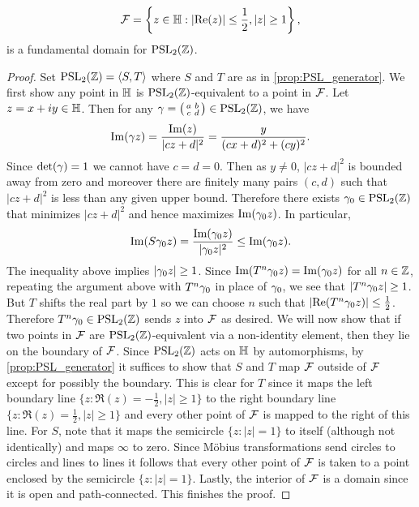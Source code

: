       \begin{proposition}\label{prop:fundamental_domain_modular_group}
        \[
          \mathcal{F} = \left\{z \in \mathbb{H}:|\mathrm{Re}(z)| \le \frac{1}{2}, |z| \ge 1\right\},
        \]
        is a fundamental domain for $\mathrm{PSL}_{2}(\mathbb{Z})$.
      \end{proposition}
      \begin{proof}
        Set $\mathrm{PSL}_{2}(\mathbb{Z}) = \langle S,T\rangle$ where $S$ and $T$ are as in \cref{prop:PSL_generator}. We first show any point in $\mathbb{H}$ is $\mathrm{PSL}_{2}(\mathbb{Z})$-equivalent to a point in $\mathcal{F}$. Let $z = x+iy \in \mathbb{H}$. Then for any $\gamma = \begin{psmallmatrix} a & b \\ c & d \end{psmallmatrix} \in \mathrm{PSL}_{2}(\mathbb{Z})$, we have
        \[
          \mathrm{Im}(\gamma z) = \frac{\mathrm{Im}(z)}{|cz+d|^{2}} = \frac{y}{(cx+d)^{2}+(cy)^{2}}.
        \]
        Since $\det(\gamma) = 1$ we cannot have $c = d = 0$. Then as $y \neq 0$, $|cz+d|^{2}$ is bounded away from zero and moreover there are finitely many pairs $(c,d)$ such that $|cz+d|^{2}$ is less than any given upper bound. Therefore there exists $\gamma_{0} \in \mathrm{PSL}_{2}(\mathbb{Z})$ that minimizes $|cz+d|^{2}$ and hence maximizes $\mathrm{Im}(\gamma_{0}z)$. In particular,
        \[
          \mathrm{Im}(S\gamma_{0}z) = \frac{\mathrm{Im}(\gamma_{0}z)}{|\gamma_{0}z|^{2}} \le \mathrm{Im}(\gamma_{0}z).
        \]
        The inequality above implies $|\gamma_{0}z| \ge 1$. Since $\mathrm{Im}(T^{n}\gamma_{0}z) = \mathrm{Im}(\gamma_{0}z)$ for all $n \in \mathbb{Z}$, repeating the argument above with $T^{n}\gamma_{0}$ in place of $\gamma_{0}$, we see that $|T^{n}\gamma_{0}z| \ge 1$. But $T$ shifts the real part by $1$ so we can choose $n$ such that $|\mathrm{Re}(T^{n}\gamma_{0}z)| \le \frac{1}{2}$. Therefore $T^{n}\gamma_{0} \in \mathrm{PSL}_{2}(\mathbb{Z})$ sends $z$ into $\mathcal{F}$ as desired. We will now show that if two points in $\mathcal{F}$ are $\mathrm{PSL}_{2}(\mathbb{Z})$-equivalent via a non-identity element, then they lie on the boundary of $\mathcal{F}$. Since $\mathrm{PSL}_{2}(\mathbb{Z})$ acts on $\mathbb{H}$ by automorphisms, by \cref{prop:PSL_generator} it suffices to show that $S$ and $T$ map $\mathcal{F}$ outside of $\mathcal{F}$ except for possibly the boundary. This is clear for $T$ since it maps the left boundary line $\{z:\Re(z) = -\frac{1}{2},|z| \ge 1\}$ to the right boundary line $\{z:\Re(z) = \frac{1}{2},|z| \ge 1\}$ and every other point of $\mathcal{F}$ is mapped to the right of this line. For $S$, note that it maps the semicircle $\{z:|z| = 1\}$ to itself (although not identically) and maps $\infty$ to zero. Since M\"obius transformations send circles to circles and lines to lines it follows that every other point of $\mathcal{F}$ is taken to a point enclosed by the semicircle $\{z:|z| = 1\}$. Lastly, the interior of $\mathcal{F}$ is a domain since it is open and path-connected. This finishes the proof.
      \end{proof}

